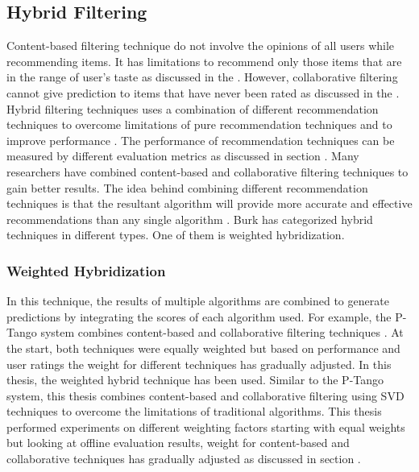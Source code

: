 \subsection{Hybrid Filtering}
Content-based filtering technique do not involve the opinions of all users while recommending items. It has limitations to recommend only those items that are in the range of user's taste as discussed in the . However, collaborative filtering cannot give prediction to items that have never been rated as discussed in the . Hybrid filtering techniques uses a combination of different recommendation techniques to overcome limitations of pure recommendation techniques and to improve performance \cite{37,38}. The performance of recommendation techniques can be measured by different evaluation metrics as discussed in section . Many researchers have combined content-based and collaborative filtering techniques to gain better results. The idea behind combining different recommendation techniques is that the resultant algorithm will provide more accurate and effective recommendations than any single algorithm \cite{39}. Burk \cite{40} has categorized hybrid techniques in different types. One of them is weighted hybridization.\\

\subsubsection{Weighted Hybridization}
In this technique, the results of multiple algorithms are combined to generate predictions by integrating the scores of each algorithm used. For example, the P-Tango system combines content-based and collaborative filtering techniques \cite{41}. At the start, both techniques were equally weighted but based on performance and user ratings the weight for different techniques has gradually adjusted. In this thesis, the weighted hybrid technique has been used. Similar to the P-Tango system, this thesis combines content-based and collaborative filtering using SVD techniques to overcome the limitations of traditional algorithms. This thesis performed experiments on different weighting factors starting with equal weights but looking at offline evaluation results, weight for content-based and collaborative techniques has gradually adjusted as discussed in section .



